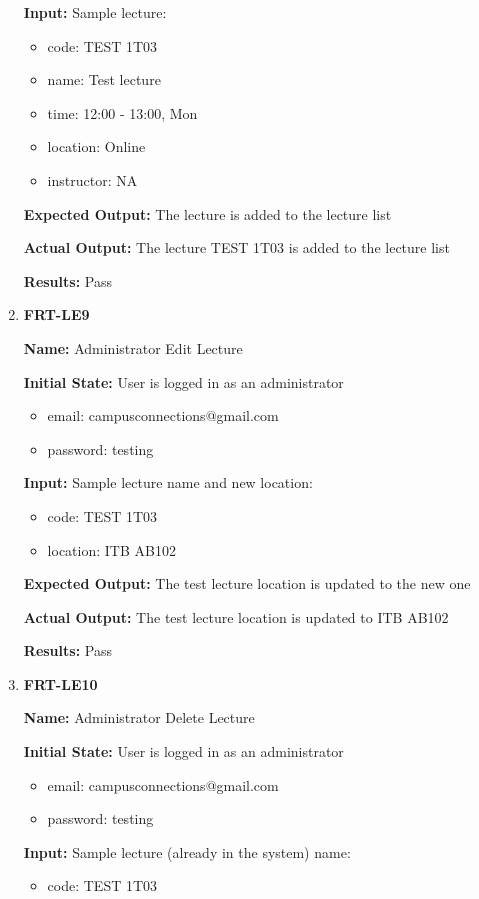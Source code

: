 \documentclass[12pt, titlepage]{article}
\begin{document}
\begin{enumerate}
\textbf{Input:} Sample lecture:
\begin{itemize}
\item code: TEST 1T03
\item name: Test lecture
\item time: 12:00 - 13:00, Mon
\item location: Online
\item instructor: NA
\end{itemize}
					
\textbf{Expected Output:} The lecture is added to the lecture list

\textbf{Actual Output:} The lecture TEST 1T03 is added to the lecture list

\textbf{Results:} Pass

\item \textbf{FRT-LE9}

\textbf{Name:} Administrator Edit Lecture

\textbf{Initial State:} User is logged in as an administrator
\begin{itemize}
\item email: campusconnections@gmail.com
\item password: testing
\end{itemize}

\textbf{Input:} Sample lecture name and new location:
\begin{itemize}
\item code: TEST 1T03
\item location: ITB AB102
\end{itemize}
					
\textbf{Expected Output:} The test lecture location is updated to the new one

\textbf{Actual Output:} The test lecture location is updated to ITB AB102

\textbf{Results:} Pass

\item \textbf{FRT-LE10}

\textbf{Name:} Administrator Delete Lecture

\textbf{Initial State:} User is logged in as an administrator
\begin{itemize}
\item email: campusconnections@gmail.com
\item password: testing
\end{itemize}

\textbf{Input:} Sample lecture (already in the system) name:
\begin{itemize}
\item code: TEST 1T03
\end{itemize}
					

\end{enumerate}
\end{document}
